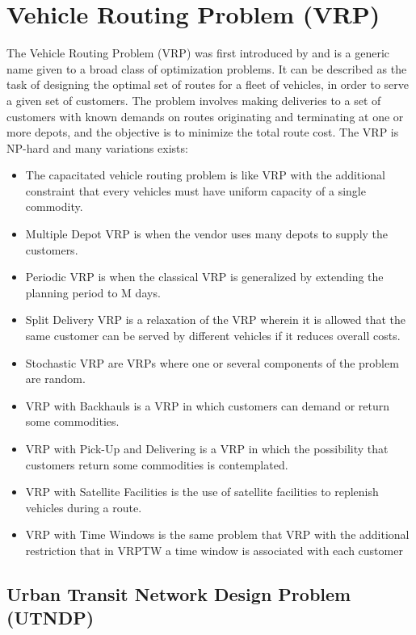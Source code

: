\section{Vehicle Routing Problem (VRP)}
The Vehicle Routing Problem (VRP) was first introduced by \citet{dantzig59} and is a generic name given to a broad class of optimization problems. It can be described as the task of designing the optimal set of routes for a fleet of vehicles, in order to serve a given set of customers. The problem involves making deliveries to a set of customers with known demands on routes originating and terminating at one or more depots, and the objective is to minimize the total route cost. The VRP is NP-hard and many variations exists:
\begin{itemize}
\item The capacitated vehicle routing problem is like VRP with the additional constraint that every vehicles must have uniform capacity of a single commodity.
\item Multiple Depot VRP is when the vendor uses many depots to supply the customers.
\item Periodic VRP is when the classical VRP is generalized by extending the planning period to M days.
\item Split Delivery VRP is a relaxation of the VRP wherein it is allowed that the same customer can be served by different vehicles if it reduces overall costs. 
\item Stochastic VRP are VRPs where one or several components of the problem are random.
\item VRP with Backhauls is a VRP in which customers can demand or return some commodities.
\item VRP with Pick-Up and Delivering is a VRP in which the possibility that customers return some commodities is contemplated.
\item VRP with Satellite Facilities is the use of satellite facilities to replenish vehicles during a route.
\item VRP with Time Windows is the same problem that VRP with the additional restriction that in VRPTW a time window is associated with each customer
\end{itemize}
\citep{website:neo}

\subsection{Urban Transit Network Design Problem (UTNDP)}


